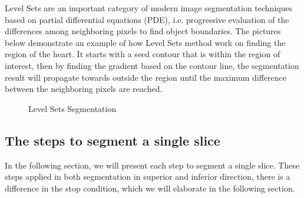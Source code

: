 Level Sets are an important category of modern image segmentation techniques based on partial differential equations (PDE), i.e. progressive evaluation of the differences among neighboring pixels to find object boundaries. The pictures below demonstrate an example of how Level Sets method work on finding the region of the heart. It starts with a seed contour that is within the region of interest, then by finding the gradient based on the contour line, the segmentation result will propagate towards outside the region until the maximum difference between the neighboring pixels are reached.

\begin{figure}[H] 
\centering
{}%
%
%
\caption{Level Sets Segmentation}
\label{LSS}
\end{figure}

\subsection{The steps to segment a single slice}
In the following section, we will present each step to segment a single slice. These steps applied in both segmentation in superior and inferior direction, there is a difference in the stop condition, which we will elaborate in the following section.
